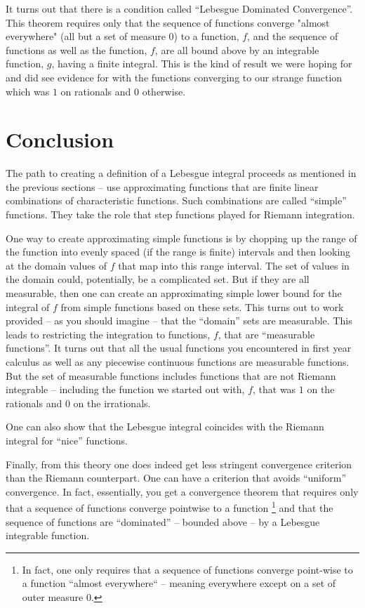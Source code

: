 \documentclass{article}
\begin{document}
It turns out that there is a condition called ``Lebesgue Dominated Convergence''.
This theorem requires only that the sequence of functions converge "almost everywhere"
(all but a set of measure $0$) to a function, $f$, and the sequence of functions 
as well as the function, $f$,
are all bound above by an integrable function, $g$, having a finite integral.
This is the kind of result we were hoping for and did see evidence for with 
the functions converging to our strange function which was $1$ on rationals
and $0$ otherwise.


\section{Conclusion}

The path to creating a definition of a Lebesgue integral proceeds as mentioned 
in the previous sections -- use approximating functions that are finite linear
combinations of characteristic functions. Such combinations are called ``simple''
functions. They take the role that step functions played for Riemann integration. 

One way to create approximating simple functions is by chopping up the range 
of the function into evenly spaced (if the range is finite) intervals and then 
looking at the domain values of $f$ that map into this range interval. 
The set of values in the domain could, potentially, be a complicated set. 
But if they are all measurable, then one can create an approximating simple 
lower bound for the integral of $f$ from simple functions based on these sets. 
This turns out to work provided -- as you should imagine -- that the ``domain'' 
sets are measurable. This leads to restricting the integration to functions, $f$, 
that are ``measurable functions''. It turns out that all the usual functions you 
encountered in first year calculus as well as any piecewise continuous functions 
are measurable functions. But the set of measurable functions includes functions 
that are not Riemann integrable -- including the function we started out with, $f$, 
that was $1$ on the rationals and $0$ on the irrationals.

One can also show that the Lebesgue integral coincides with the Riemann integral 
for ``nice'' functions.

Finally, from this theory one does indeed get less stringent convergence 
criterion than the Riemann counterpart. One can have a criterion that avoids 
``uniform'' convergence. In fact, essentially, you get a convergence theorem 
that requires only that a sequence of functions converge pointwise to a function%
\footnote{In fact, one only requires that a sequence of functions converge point-wise 
to a function ``almost everywhere`` -- meaning everywhere except on a set of 
outer measure $0$.} and that the sequence of functions 
are ``dominated'' -- bounded above -- by a Lebesgue integrable function.
\end{document}
